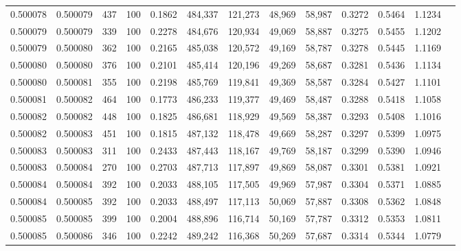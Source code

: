 \begin{tabular}{rrrrrrrrrrrrr}
0.500078 & 0.500079 &   437 & 100 &                                     0.1862 & 484,337 & 121,273 &  48,969 &  58,987 & 0.3272 & 0.5464 & 1.1234 \\
0.500079 & 0.500079 &   339 & 100 &                                     0.2278 & 484,676 & 120,934 &  49,069 &  58,887 & 0.3275 & 0.5455 & 1.1202 \\
0.500079 & 0.500080 &   362 & 100 &                                     0.2165 & 485,038 & 120,572 &  49,169 &  58,787 & 0.3278 & 0.5445 & 1.1169 \\
0.500080 & 0.500080 &   376 & 100 &                                     0.2101 & 485,414 & 120,196 &  49,269 &  58,687 & 0.3281 & 0.5436 & 1.1134 \\
0.500080 & 0.500081 &   355 & 100 &                                     0.2198 & 485,769 & 119,841 &  49,369 &  58,587 & 0.3284 & 0.5427 & 1.1101 \\
0.500081 & 0.500082 &   464 & 100 &                                     0.1773 & 486,233 & 119,377 &  49,469 &  58,487 & 0.3288 & 0.5418 & 1.1058 \\
0.500082 & 0.500082 &   448 & 100 &                                     0.1825 & 486,681 & 118,929 &  49,569 &  58,387 & 0.3293 & 0.5408 & 1.1016 \\
0.500082 & 0.500083 &   451 & 100 &                                     0.1815 & 487,132 & 118,478 &  49,669 &  58,287 & 0.3297 & 0.5399 & 1.0975 \\
0.500083 & 0.500083 &   311 & 100 &                                     0.2433 & 487,443 & 118,167 &  49,769 &  58,187 & 0.3299 & 0.5390 & 1.0946 \\
0.500083 & 0.500084 &   270 & 100 &                                     0.2703 & 487,713 & 117,897 &  49,869 &  58,087 & 0.3301 & 0.5381 & 1.0921 \\
0.500084 & 0.500084 &   392 & 100 &                                     0.2033 & 488,105 & 117,505 &  49,969 &  57,987 & 0.3304 & 0.5371 & 1.0885 \\
0.500084 & 0.500085 &   392 & 100 &                                     0.2033 & 488,497 & 117,113 &  50,069 &  57,887 & 0.3308 & 0.5362 & 1.0848 \\
0.500085 & 0.500085 &   399 & 100 &                                     0.2004 & 488,896 & 116,714 &  50,169 &  57,787 & 0.3312 & 0.5353 & 1.0811 \\
0.500085 & 0.500086 &   346 & 100 &                                     0.2242 & 489,242 & 116,368 &  50,269 &  57,687 & 0.3314 & 0.5344 & 1.0779 \\

\end{tabular}
